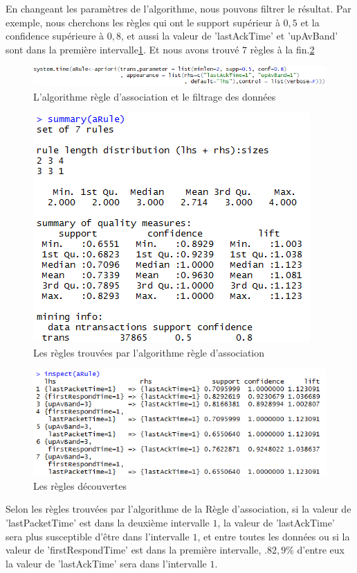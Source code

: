 En changeant les paramètres de l'algorithme, nous pouvons filtrer le résultat. Par exemple, nous cherchons les règles qui ont le support supérieur à
$0,5$ et la confidence supérieure à $0,8$, et aussi la valeur de 'lastAckTime' et 'upAvBand' sont dans la première intervalle\ref{fig:arp}. Et nous avons trouvé $7$ règles à la fin.\ref{fig:newar}

\begin{figure}[H]
\centering
\includegraphics[width=1.2\linewidth]{images/arp}
\caption{L'algorithme règle d'association et le filtrage des données  }
\label{fig:arp}
\end{figure}


\begin{figure}[H]
\centering
\includegraphics[width=0.5\linewidth]{images/ars}
\caption{Les règles trouvées par l'algorithme règle d'association  }
\label{fig:newar}
\end{figure}

\begin{figure}[H]
\centering
\includegraphics[width=0.8\linewidth]{images/AR2}
\caption{Les règles découvertes}
\label{fig:AR2}
\end{figure}

Selon les règles trouvées par l'algorithme de la Règle d'association, si la valeur de 'lastPacketTime' est dans la deuxième intervalle $1$, la valeur de 'lastAckTime' sera plus susceptible d'être dans l'intervalle $1$, et entre toutes les données ou si la valeur de 'firstRespondTime' est dans la première intervalle, $.82,9\%$ d'entre eux la valeur de 'lastAckTime' sera dans l'intervalle $1$.

